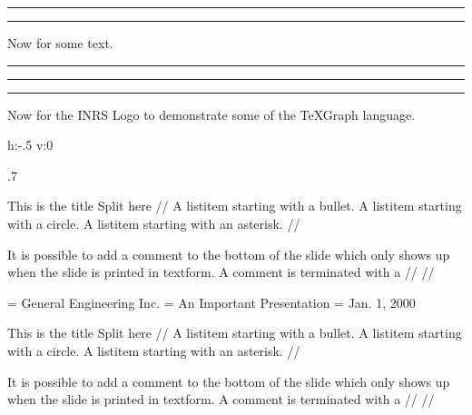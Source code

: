 
\hrule
{}
\hrule 

Now for some text. 
\bigskip 
\hrule 
{}
\hrule 
\bigskip 
{}
\hrule
\vskip 1in
Now for the INRS Logo to demonstrate some of the \TeX Graph language.



\inrslogoadd  h:-.5 v:0 


\ejectpage

\formscale .7

\inrsform %

\fullform %

\hslide This is the title \cr Split here //
\bl 
\lb A listitem  starting with a bullet.
\lc A listitem starting with a circle. 
\last A listitem starting with an asterisk. 
\el
//  %

\comment 
It is possible to add a comment to the bottom of the slide which
only shows up when the slide is printed in textform. A comment is
terminated with a {//} //

\textform %


\topdata = {General Engineering Inc.}
\botdata = {An Important Presentation}
\slidedate = {Jan. 1, 2000}
\genform %

\hslide This is the title \cr Split here //
\bl 
\lb A listitem  starting with a bullet.
\lc A listitem starting with a circle. 
\last A listitem starting with an asterisk. 
\el
//  %

\comment 
It is possible to add a comment to the bottom of the slide which
only shows up when the slide is printed in textform. A comment is
terminated with a {//} //


\bigskip 
{}



           

\done


